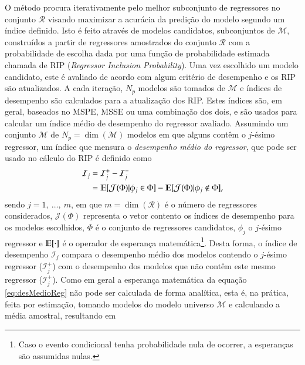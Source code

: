 O método procura iterativamente pelo melhor subconjunto de regressores no conjunto $\mathscr{R}$ visando maximizar a acurácia da predição do modelo segundo um índice definido. Isto é feito através de modelos candidatos, subconjuntos de $\mathscr{M}$, construídos a partir de regressores amostrados do conjunto $\mathscr{R}$ com a probabilidade de escolha dada por uma função de probabilidade estimada chamada de RIP (\textit{Regressor Inclusion Probability}).
Uma vez escolhido um modelo candidato, este é avaliado de acordo com algum critério de desempenho e os RIP são atualizados. A cada iteração, $N_p$ modelos são tomados de $\mathscr{M}$ e índices de desempenho são calculados para a atualização dos RIP.
Estes índices são, em geral,  baseados no MSPE, MSSE ou uma combinação dos dois, e são usados para calcular um índice médio de desempenho do regressor avaliado.
Assumindo um conjunto $\mathscr{M}$ de $N_p = \dim(\mathscr{M})$ modelos em que alguns contêm o $j$-ésimo regressor, um índice que mensura o \textit{desempenho médio do regressor}, que pode ser usado no cálculo do RIP é definido como
\begin{align}
   \mathcal{I}_j &= \mathcal{I}_j^+ - \mathcal{I}_j^- \nonumber\\
      &= \mathbb{E}[\mathcal{J}(\Phi)|\phi_j \in \Phi] - \mathbb{E}[\mathcal{J}(\Phi)|\phi_j \notin \Phi],
\label{eq:desMedioReg}
\end{align}
sendo $j = 1,\ \dots,\ m$, em que  $m = \dim{(\mathscr{R})}$ é o número de regressores considerados, $\mathcal{J}(\Phi)$ representa o vetor contento os índices de desempenho para os modelos escolhidos, $\Phi$ é o conjunto de regressores candidatos, $\phi_j$ o $j$-ésimo regressor e $\mathbb{E}[\cdot]$ é o operador de esperança matemática\footnote{Caso o evento condicional tenha probabilidade nula de ocorrer, a esperanças são assumidas nulas.}. Desta forma, o índice de desempenho $\mathcal{I}_j$ compara o desempenho médio dos modelos contendo o $j$-ésimo regressor ($ \mathcal{I}_j^+$) com o desempenho dos modelos que não contêm este mesmo regressor ($ \mathcal{I}_j^+$). 
Como em geral a esperança matemática da equação \eqref{eq:desMedioReg} não pode ser calculada de forma analítica, esta é, na prática, feita por estimação, tomando modelos do modelo universo $\mathscr{M}$ e calculando a média amostral, resultando em
